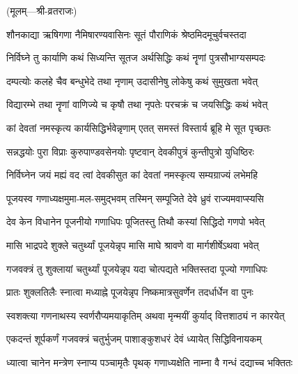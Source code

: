 \centerline{\small{(मूलम्—श्री-व्रतराजः)}}

\twolineshloka
{शौनकाद्या ऋषिगणा नैमिषारण्यवासिनः}
{सूतं पौराणिकं श्रेष्ठमिदमूचुर्वचस्तदा}%


\twolineshloka
{निर्विघ्ने तु कार्याणि कथं सिध्यन्ति सूतज}
{अर्थसिद्धिः कथं नॄणां पुत्रसौभाग्यसम्पदः}%

\twolineshloka
{दम्पत्योः कलहे चैव बन्धुभेदे तथा नृणाम्}
{उदासीनेषु लोकेषु कथं सुमुखता भवेत्}%

\twolineshloka
{विद्यारम्भे तथा नॄणां वाणिज्ये च कृषौ तथा}
{नृपतेः परचक्रं च जयसिद्धिः कथं भवेत्}%

\twolineshloka
{कां देवतां नमस्कृत्य कार्यसिद्धिर्भवेन्नृणाम्}
{एतत् समस्तं विस्तार्य ब्रूहि मे सूत पृच्छतः}%

\twolineshloka
{सन्नद्धयोः पुरा विप्राः कुरुपाण्डवसेनयोः}
{पृष्टवान् देवकीपुत्रं कुन्तीपुत्रो युधिष्ठिरः}%


\twolineshloka
{निर्विघ्नेन जयं मह्यं वद त्वां देवकीसुत}
{कां देवतां नमस्कृत्य सम्यग्राज्यं लभेमहि}%


\twolineshloka
{पूजयस्व गणाध्यक्षमुमा-मल-समुद्भवम्}
{तस्मिन् सम्पूजिते देवे ध्रुवं राज्यमवाप्स्यसि}%


\twolineshloka
{देव केन विधानेन पूजनीयो गणाधिपः}
{पूजितस्तु तिथौ कस्यां सिद्धिदो गणपो भवेत्}%


\twolineshloka
{मासि भाद्रपदे शुक्ले चतुर्थ्यां पूजयेन्नृप}
{मासि माघे श्रावणे वा मार्गशीर्षेऽथवा भवेत्}%

\twolineshloka
{गजवक्त्रं तु शुक्लायां चतुर्थ्यां पूजयेन्नृप}
{यदा चोत्पद्यते भक्तिस्तदा पूज्यो गणाधिपः}%

\twolineshloka
{प्रातः शुक्लतिलैः स्नात्वा मध्याह्ने पूजयेन्नृप}
{निष्कमात्रसुवर्णेन तदर्धार्धेन वा पुनः}%

\twolineshloka
{स्वशक्त्या गणनाथस्य स्वर्णरौप्यमयाकृतिम्}
{अथवा मृन्मयीं कुर्याद् वित्तशाठ्यं न कारयेत्}%

\twolineshloka
{एकदन्तं शूर्पकर्णं गजवक्त्रं चतुर्भुजम्}
{पाशाङ्कुशधरं देवं ध्यायेत् सिद्धिविनायकम्}%

\twolineshloka
{ध्यात्वा चानेन मन्त्रेण स्नाप्य पञ्चामृतैः पृथक्}
{गणाध्यक्षेति नाम्ना वै गन्धं दद्याच्च भक्तितः}%

